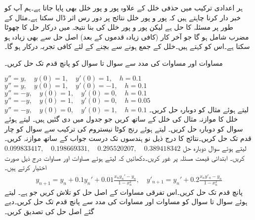 ہر اعدادی  ترکیب میں حذفی خلل کے علاوہ  پور و پور خلل بھی پایا جاتا ہے۔ہم آپ کو خبر دار کرنا چاہتے ہیں کہ پور و پور خلل نتائج پر دور رس اثر ڈال سکتا ہے۔مثال کے طور پر مسئلہ  کا حل  ہے لیکن پور و پور خلل کی بنا نتیجہ میں  درکار حل  کا چھوٹا مضرب  شامل ہو گا جو آخر کار (کافی زیادہ قدموں کے بعد) اصل حل سے بھی زیادہ ہو سکتا ہے۔اس کو  کہتے ہیں۔خلل کے جمع ہونے سے بچنے کے لئے کافی تجربہ درکار ہو گا۔


مساوات  اور مساوات  کی مدد سے  سوال  تا سوال  کو پانچ قدم تک حل کریں۔

\quad
$y''=y,\quad y(0)=1,\quad y'(0)=1,\quad h=0.1$
\quad
$y''=y,\quad y(0)=1,\quad y'(0)=-1,\quad h=0.1$
\quad
$y''=-y,\quad y(0)=1,\quad y'(0)=0,\quad h=0.1$
\quad
$y''=-y,\quad y(0)=1,\quad y'(0)=0,\quad h=0.05$
\quad
$y''=-y,\quad y(0)=0,\quad y'(0)=1,\quad h=0.1$
\quad
{} لیتے ہوئے مثال  کو دوبارہ حل کریں۔خلل کا موازنہ مثال  کی خلل کے ساتھ کریں جو جدول  میں دی گئیں ہیں۔ 
\quad
{} لیتے ہوئے سوال  کو دوبارہ حل کریں۔
\quad
{} لیتے ہوئے رنج کوٹا نیستروم کی ترکیب سے سوال  کو چار قدم تک حل کریں۔نتائج کا درج ذیل نو ہندسوں تک درست جواب کے ساتھ موازنہ کریں۔\\
$\num{0.099833417},\quad \num{0.198669331},\quad \num{0.295520207},\quad \num{0.389418342}$
\quad
{} لیتے ہوئے سوال  دوبارہ حل کریں۔
\quad
ابتدائی قیمت مسئلہ  پر غور کریں۔دکھائیں کہ  لیتے ہوئے مساوات  اور مساوات  درج ذیل صورت اختیار کرتے ہیں۔
\begin{align*}
y_{n+1}=y_n+0.1y_n'+0.01\frac{x_ny_n'-y_n}{1-x^2_n},\quad y'_{n+1}=y_n'+0.2\frac{x_ny'_n-y_n}{1-x^2_n}
\end{align*}
پانچ قدم تک حل کریں۔اس تفرقی مساوات کے  اصل حل کو تلاش کریں جو  ہے۔
 لیتے ہوئے سوال  تا سوال  کو مساوات  اور مساوات  کی مدد سے پانچ قدم تک حل کریں۔دیے گئے اصل حل کی تصدیق کریں۔

